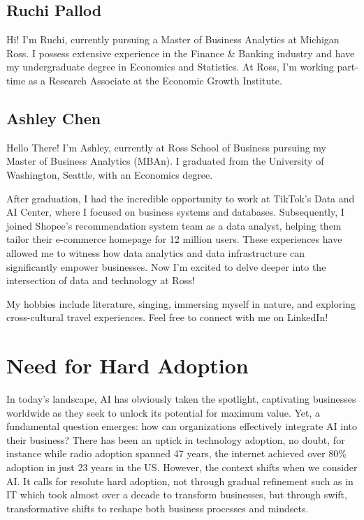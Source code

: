 \documentclass[
]{article}
\begin{document}
\hypertarget{ruchi-pallod}{%
\subsection{Ruchi Pallod}\label{ruchi-pallod}}

Hi! I'm Ruchi, currently pursuing a Master of Business Analytics at Michigan Ross. I possess extensive experience in the Finance \& Banking industry and have my undergraduate degree in Economics and Statistics. At Ross, I'm working part-time as a Research Associate at the Economic Growth Institute.

\hypertarget{ashley-chen}{%
\subsection{Ashley Chen}\label{ashley-chen}}

Hello There! I'm Ashley, currently at Ross School of Business pursuing my Master of Business Analytics (MBAn). I graduated from the University of Washington, Seattle, with an Economics degree.

After graduation, I had the incredible opportunity to work at TikTok's Data and AI Center, where I focused on business systems and databases. Subsequently, I joined Shopee's recommendation system team as a data analyst, helping them tailor their e-commerce homepage for 12 million users. These experiences have allowed me to witness how data analytics and data infrastructure can significantly empower businesses. Now I'm excited to delve deeper into the intersection of data and technology at Ross!

My hobbies include literature, singing, immersing myself in nature, and exploring cross-cultural travel experiences. Feel free to connect with me on LinkedIn!

\hypertarget{need-for-hard-adoption}{%
\section{Need for Hard Adoption}\label{need-for-hard-adoption}}

In today's landscape, AI has obviously taken the spotlight, captivating businesses worldwide as they seek to unlock its potential for maximum value. Yet, a fundamental question emerges: how can organizations effectively integrate AI into their business? There has been an uptick in technology adoption, no doubt, for instance while radio adoption spanned 47 years, the internet achieved over 80\% adoption in just 23 years in the US. However, the context shifts when we consider AI. It calls for resolute hard adoption, not through gradual refinement such as in IT which took almost over a decade to transform businesses, but through swift, transformative shifts to reshape both business processes and mindsets.
\end{document}
